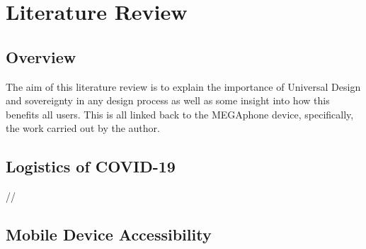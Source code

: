
\chapter{Literature Review} %

\label{Chapter2} %


\section{Overview}

The aim of this literature review is to explain the importance of Universal Design and sovereignty in any design process as well as some insight into how this benefits all users. 
This is all linked back to the MEGAphone device, specifically, the work carried out by the author.



\section{Logistics of COVID-19}


//


\section{Mobile Device Accessibility}


